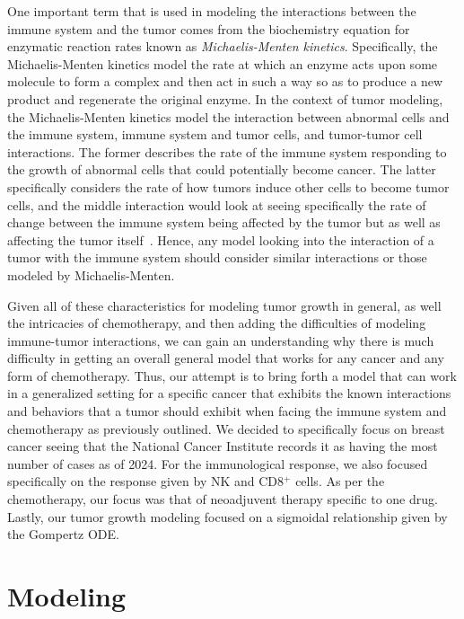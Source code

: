 \documentclass[11pt]{amsart}
\begin{document}
One important term that is used in modeling the interactions between the immune system and the tumor comes from the biochemistry equation for enzymatic reaction rates known as \textit{Michaelis-Menten kinetics}.
Specifically, the Michaelis-Menten kinetics model the rate at which an enzyme acts upon some molecule to form a complex and then act in such a way so as to produce a new product and regenerate the original enzyme.
In the context of tumor modeling, the Michaelis-Menten kinetics model the interaction between abnormal cells and the immune system, immune system and tumor cells, and tumor-tumor cell interactions.
The former describes the rate of the immune system responding to the growth of abnormal cells that could potentially become cancer.
The latter specifically considers the rate of how tumors induce other cells to become tumor cells, and the middle interaction would look at seeing specifically the rate of change between the immune system being affected by the tumor but as well as affecting the tumor itself\ \cite{math8081285}.
Hence, any model looking into the interaction of a tumor with the immune system should consider similar interactions or those modeled by Michaelis-Menten.


Given all of these characteristics for modeling tumor growth in general, as well the intricacies of chemotherapy, and then adding the difficulties of modeling immune-tumor interactions, we can gain an understanding why there is much difficulty in getting an overall general model that works for any cancer and any form of chemotherapy.
Thus, our attempt is to bring forth a model that can work in a generalized setting for a specific cancer that exhibits the known interactions and behaviors that a tumor should exhibit when facing the immune system and chemotherapy as previously outlined. 
We decided to specifically focus on breast cancer seeing that the National Cancer Institute records it as having the most number of cases as of 2024.
For the immunological response, we also focused specifically on the response given by NK and CD8$^+$ cells.
As per the chemotherapy, our focus was that of neoadjuvent therapy specific to one drug.
Lastly, our tumor growth modeling focused on a sigmoidal relationship given by the Gompertz ODE.


\section{Modeling}

\end{document}
